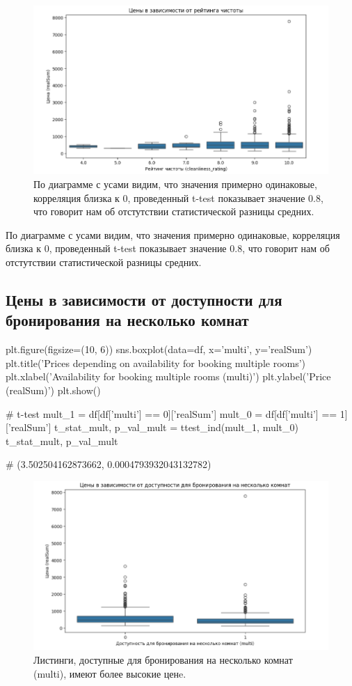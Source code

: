 \documentclass[
	11pt
] {article}
\begin{document}
	\begin{figure}[H]
		\centering
		\includegraphics[width=1.0\textwidth]{fig-09}
		\caption{По диаграмме с усами видим, что значения примерно одинаковые, корреляция близка к 0, проведенный t-test показывает значение 0.8, что говорит нам об отстутствии статистической разницы средних.}
	\end{figure}
	По диаграмме с усами видим, что значения примерно одинаковые, корреляция близка к 0, проведенный t-test показывает значение 0.8, что говорит нам об отстутствии статистической разницы средних.

\subsection{Цены в зависимости от доступности для бронирования на несколько комнат}
\begin{python}
plt.figure(figsize=(10, 6))
sns.boxplot(data=df, x='multi', y='realSum')
plt.title('Prices depending on availability for booking multiple rooms')
plt.xlabel('Availability for booking multiple rooms (multi)')
plt.ylabel('Price (realSum)')
plt.show()

# t-test
mult_1 = df[df['multi'] == 0]['realSum']
mult_0 = df[df['multi'] == 1]['realSum']
t_stat_mult, p_val_mult = ttest_ind(mult_1, mult_0)
t_stat_mult, p_val_mult

# (3.502504162873662, 0.0004793932043132782)
\end{python}

	\begin{figure}[H]
		\centering
		\includegraphics[width=1.0\textwidth]{fig-10}
		\caption{Листинги, доступные для бронирования на несколько комнат (multi), имеют более высокие ценe.}
	\end{figure}
\end{document}
